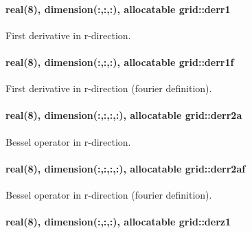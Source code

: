 \paragraph[{\texorpdfstring{derr1}{derr1}}]{\setlength{\rightskip}{0pt plus 5cm}real(8), dimension(\+:,\+:,\+:), allocatable grid\+::derr1}\hypertarget{namespacegrid_a927d3ab579693ac5d3d1b383fc47309e}{}\label{namespacegrid_a927d3ab579693ac5d3d1b383fc47309e}


First derivative in r-\/direction. 

\paragraph[{\texorpdfstring{derr1f}{derr1f}}]{\setlength{\rightskip}{0pt plus 5cm}real(8), dimension(\+:,\+:,\+:), allocatable grid\+::derr1f}\hypertarget{namespacegrid_a0039357c12385ef014b08446e7cc0e6c}{}\label{namespacegrid_a0039357c12385ef014b08446e7cc0e6c}


First derivative in r-\/direction (fourier definition). 

\paragraph[{\texorpdfstring{derr2a}{derr2a}}]{\setlength{\rightskip}{0pt plus 5cm}real(8), dimension(\+:,\+:,\+:,\+:), allocatable grid\+::derr2a}\hypertarget{namespacegrid_a3d6fc00aedb6c70b6a7028425fcf06b6}{}\label{namespacegrid_a3d6fc00aedb6c70b6a7028425fcf06b6}


Bessel operator in r-\/direction. 

\paragraph[{\texorpdfstring{derr2af}{derr2af}}]{\setlength{\rightskip}{0pt plus 5cm}real(8), dimension(\+:,\+:,\+:,\+:), allocatable grid\+::derr2af}\hypertarget{namespacegrid_a8804ec2dcbfca2354a910b528fcd10d0}{}\label{namespacegrid_a8804ec2dcbfca2354a910b528fcd10d0}


Bessel operator in r-\/direction (fourier definition). 

\paragraph[{\texorpdfstring{derz1}{derz1}}]{\setlength{\rightskip}{0pt plus 5cm}real(8), dimension(\+:,\+:,\+:), allocatable grid\+::derz1}\hypertarget{namespacegrid_a16bcad48837c65e5d97745b347cafefc}{}\label{namespacegrid_a16bcad48837c65e5d97745b347cafefc}



